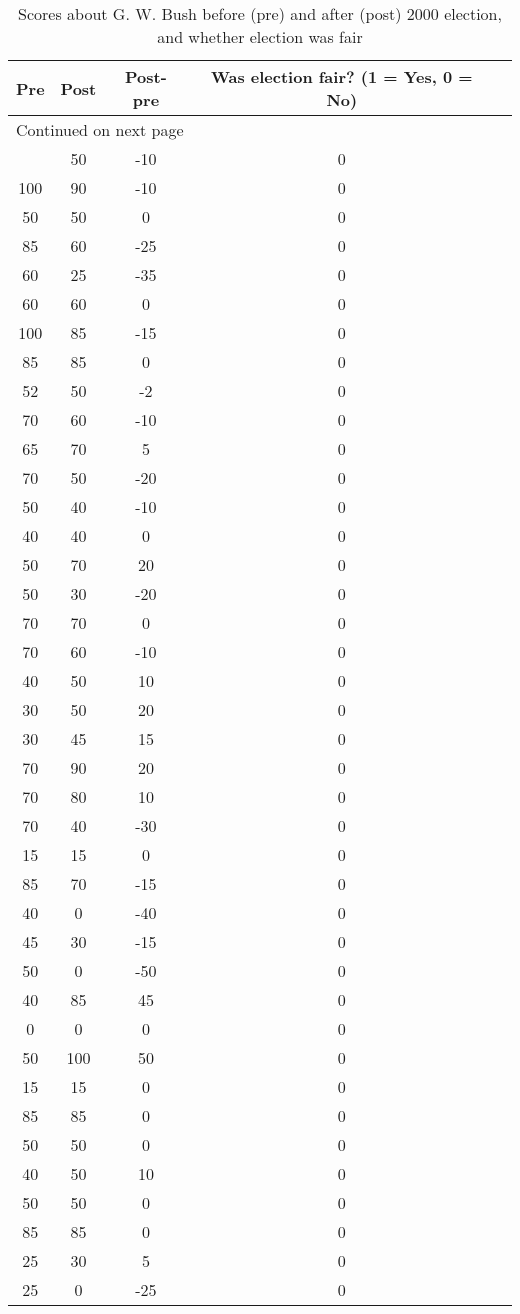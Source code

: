 \newpage
\begin{longtable}{ccccc}
\caption{Scores about G. W. Bush before (pre) and after (post) 2000 election, and whether election was fair \label{tab:bushdata}} \\
Pre & Post & Post-pre & Was election fair? (1 = Yes, 0 = No)  \\
\hline
\endhead
\hline \multicolumn{4}{l}{{Continued on next page}} \\ \hline
\endfoot
\endlastfoot
60&50&-10&0\\
100&90&-10&0\\
50&50&0&0\\
85&60&-25&0\\
60&25&-35&0\\
60&60&0&0\\
100&85&-15&0\\
85&85&0&0\\
52&50&-2&0\\
70&60&-10&0\\
65&70&5&0\\
70&50&-20&0\\
50&40&-10&0\\
40&40&0&0\\
50&70&20&0\\
50&30&-20&0\\
70&70&0&0\\
70&60&-10&0\\
40&50&10&0\\
30&50&20&0\\
30&45&15&0\\
70&90&20&0\\
70&80&10&0\\
70&40&-30&0\\
15&15&0&0\\
85&70&-15&0\\
40&0&-40&0\\
45&30&-15&0\\
50&0&-50&0\\
40&85&45&0\\
0&0&0&0\\
50&100&50&0\\
15&15&0&0\\
85&85&0&0\\
50&50&0&0\\
40&50&10&0\\
50&50&0&0\\
85&85&0&0\\
25&30&5&0\\
25&0&-25&0\\

\end{longtable}
